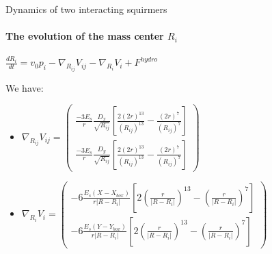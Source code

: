 \documentclass{beamer}
\begin{document}
\begin{frame}{Dynamics of two interacting squirmers}
    \framesubtitle{The evolution of the mass center $R_i$}
    \begin{center}
        \(\boxed{\frac{dR_i}{dt} = v_0 p_i -  \nabla_{R_{ij}} V_{ij} - \nabla_{R_i} V_i + F^{hydro}}\)
    \end{center}
    We have: 
    \begin{itemize}
        \item \(\nabla_{R_{ij}} V_{ij} = 
        \begin{pmatrix}
            \frac{-3 E_s}{r} \frac{D_x}{\sqrt{R_{ij}}}\left[ \frac{2(2r)^{13}}{(R_{ij})^{13}} - \frac{(2r)^7}{(R_{ij})^7} \right] \\
            \frac{-3 E_s}{r} \frac{D_y}{\sqrt{R_{ij}}}\left[ \frac{2(2r)^{13}}{(R_{ij})^{13}} - \frac{(2r)^7}{(R_{ij})^7} \right]
        \end{pmatrix}\)
        \item \(\nabla_{R_i} V_i = 
        \begin{pmatrix}
            -6 \frac{E_s (X-X_{box})}{r \lvert R - R_i \rvert } \left[ 2 \left( \frac{r}{\lvert R-R_i\rvert} \right)^{13} - \left( \frac{r}{\lvert R-R_i\rvert}\right)^7 \right] \\
            -6 \frac{E_s (Y-Y_{box})}{r \lvert R - R_i \rvert } \left[ 2 \left( \frac{r}{\lvert R-R_i\rvert} \right)^{13} - \left( \frac{r}{\lvert R-R_i\rvert}\right)^7 \right]
        \end{pmatrix}\)
    \end{itemize}
\end{frame}
\end{document}
